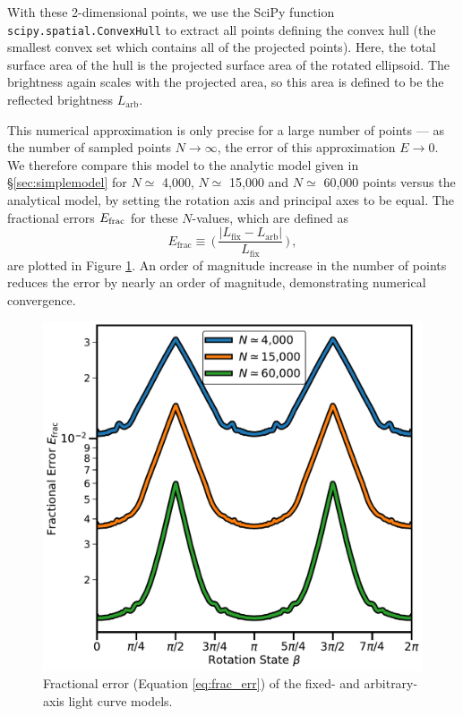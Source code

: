 \documentclass[twocolumn,doublespacing]{aastex631}
\begin{document}
With these 2-dimensional points, we use the SciPy function \texttt{scipy.spatial.ConvexHull} \citep{scipy} to extract all points defining the convex hull (the smallest convex set which contains all of the projected points). Here, the total surface area of the hull is the projected surface area of the rotated ellipsoid. The brightness again scales with the projected area, so this area is defined to be the reflected brightness $L_\text{arb}$.

This numerical approximation is only precise for a large number of points --- as the number of sampled points $N\rightarrow\infty$, the error of this approximation $E\rightarrow0$. We therefore compare this model to the analytic model given in \S\ref{sec:simplemodel} for $N\simeq$ 4,000, $N\simeq$ 15,000 and $N\simeq$ 60,000 points versus the analytical model, by setting the rotation axis and principal axes to be equal. The fractional errors $E_{\rm frac}$ for these $N$-values, which are defined as 
\begin{equation}\label{eq:frac_err}
  E_\text{frac}\equiv\,\bigg(\,\frac{|L_\text{fix}-L_\text{arb}|}{L_\text{fix}}\,\bigg)\,,
\end{equation} 
are plotted in Figure \ref{fig:numer_light_comparison}. An order of magnitude increase in the number of points reduces the error by nearly an order of magnitude, demonstrating numerical convergence.

\begin{figure}
\centering
\includegraphics[width=\linewidth,angle=0]{num_lightcurve_comp.pdf}
\caption{Fractional error (Equation \ref{eq:frac_err}) of the fixed- and arbitrary-axis light curve models. }
\label{fig:numer_light_comparison}
\end{figure}
\end{document}
